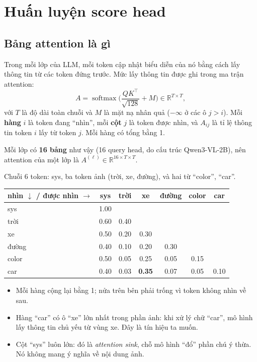\documentclass[11pt,a4paper]{article}
\newcommand{\R}{\mathbb{R}}
\newcommand{\softmax}{\operatorname{softmax}}
\begin{document}
\section{Huấn luyện score head}
\label{sec:trainall}

\subsection{Bảng attention là gì}
\label{sec:attn}
Trong mỗi lớp của LLM, mỗi token cập nhật biểu diễn của nó bằng cách lấy thông tin từ các token đứng trước. Mức lấy thông tin được ghi trong ma trận attention:
\begin{equation}
A=\softmax\!\Big(\frac{QK^\top}{\sqrt{128}}+M\Big)\in\R^{T\times T},
\end{equation}
với $T$ là độ dài toàn chuỗi và $M$ là mặt nạ nhân quả ($-\infty$ ở các ô $j>i$). Mỗi \textbf{hàng} $i$ là token đang ``nhìn'', mỗi \textbf{cột} $j$ là token được nhìn, và $A_{ij}$ là tỉ lệ thông tin token $i$ lấy từ token $j$. Mỗi hàng có tổng bằng 1.

Mỗi lớp có \textbf{16 bảng} như vậy (16 query head, do cấu trúc Qwen3-VL-2B), nên attention của một lớp là $A^{(\ell)}\in\R^{16\times T\times T}$.

\begin{vidu}
Chuỗi 6 token: sys, ba token ảnh (trời, xe, đường), và hai từ ``color'', ``car''.
\begin{center}
\begin{tabular}{@{}l|cccccc@{}}
\toprule
nhìn $\downarrow$ / được nhìn $\rightarrow$ & sys & trời & xe & đường & color & car\\
\midrule
sys & 1.00 & & & & & \\
trời & 0.60 & 0.40 & & & & \\
xe & 0.50 & 0.20 & 0.30 & & & \\
đường & 0.40 & 0.10 & 0.20 & 0.30 & & \\
color & 0.50 & 0.05 & 0.25 & 0.05 & 0.15 & \\
car & 0.40 & 0.03 & \textbf{0.35} & 0.07 & 0.05 & 0.10\\
\bottomrule
\end{tabular}
\end{center}
\begin{itemize}
\item Mỗi hàng cộng lại bằng 1; nửa trên bên phải trống vì token không nhìn về sau.
\item Hàng ``car'' có ô ``xe'' lớn nhất trong phần ảnh: khi xử lý chữ ``car'', mô hình lấy thông tin chủ yếu từ vùng xe. Đây là tín hiệu ta muốn.
\item Cột ``sys'' luôn lớn: đó là \emph{attention sink}, chỗ mô hình ``đổ'' phần chú ý thừa. Nó không mang ý nghĩa về nội dung ảnh.
\end{itemize}
\end{vidu}
\end{document}
